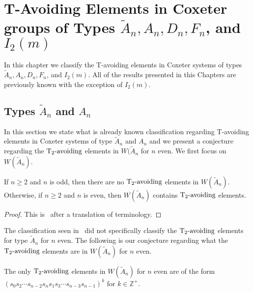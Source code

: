 \chapter{T-Avoiding Elements in Coxeter groups of Types $\widetilde{A}_n, A_n, D_n, F_n$, and $I_2(m)$}\label{chap:TandTavoid}

In this chapter we classify the T-avoiding elements in Coxeter systems of types $\widetilde{A}_n, A_n, D_n, F_n$, and $I_2(m)$. All of the results presented in this Chapters are previously known with the exception of $I_2(m)$.


\section{Types $\widetilde{A}_n$ and $A_n$}\label{sec:tavoidA}
In this section we state what is already known classification regarding T-avoiding elements in Coxeter systems of type $\widetilde{A}_n$ and $A_n$ and we present a conjecture regarding the $\operatorname{T_2-\mathrm{avoiding}}$ elements in $W(\widetilde{A}_n$ for $n$ even. We first focus on $W(\widetilde{A}_n)$.

\begin{proposition}
 If $n \geq 2$ and $n$ is odd, then there are no $\operatorname{T_2-\mathrm{avoiding}}$ elements in $W(\widetilde{A}_n)$. Otherwise, if $n \geq 2$ and $n$ is even, then $W(\widetilde{A}_n)$ contains $\operatorname{T_2-\mathrm{avoiding}}$ elements.
\begin{proof}
	This is~\cite[Proposition~3.1.2]{Fan1999} after a translation of terminology.\qedhere
\end{proof}
\end{proposition}



The classification seen in~\cite{Fan1999} did not specifically classify the $\operatorname{T_2-\mathrm{avoiding}}$ elements for type $\widetilde{A}_n$ for $n$ even. The following is our conjecture regarding what the $\operatorname{T_2-\mathrm{avoiding}}$ elements are in $W(\widetilde{A}_n)$ for $n$ even.
\begin{conjecture}
	The only $\operatorname{T_2-\mathrm{avoiding}}$ elements in $W(\widetilde{A}_n)$ for $n$ even are of the form $(s_0s_2 \cdots s_{n-2}s_ns_1s_3 \cdots s_{n-3}s_{n-1})^k$  for $k \in \mathbb{Z}^+$. 
\end{conjecture} 

